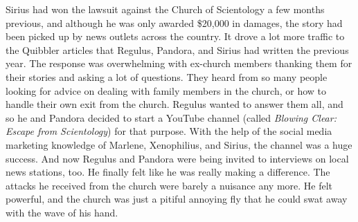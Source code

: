 \documentclass[12pt,twoside,openright]{memoir}
\begin{document}
Sirius had won the lawsuit against the Church of Scientology a few months previous, and although he was only awarded
\$20,000 in damages, the story had been picked up by news outlets across the country. It drove a lot more traffic to the Quibbler articles that Regulus, Pandora, and Sirius had written the previous year. The response was overwhelming with ex-church members thanking them for their stories and asking a lot of questions. They heard from so many people looking for advice on dealing with family members in the church, or how to handle their own exit from the church. Regulus wanted to answer them all, and so he and Pandora decided to start a YouTube channel (called
\textit{Blowing Clear: Escape from Scientology}) for that purpose. With the help of the social media marketing knowledge of Marlene, Xenophilius, and Sirius, the channel was a huge success. And now Regulus and Pandora were being invited to interviews on local news stations, too. He finally felt like he was really making a difference. The attacks he received from the church were barely a nuisance any more. He felt powerful, and the church was just a pitiful annoying fly that he could swat away with the wave of his hand.
\end{document}
